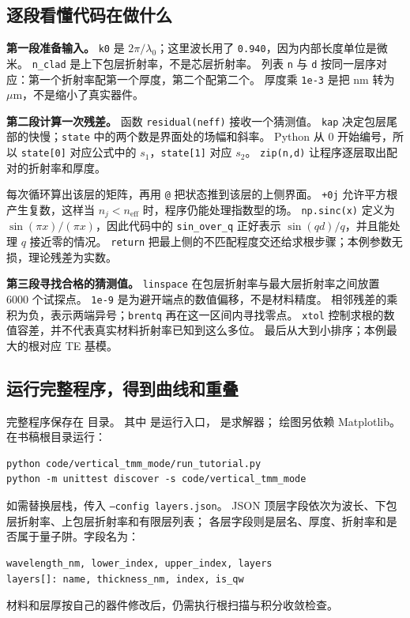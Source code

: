 \subsection{逐段看懂代码在做什么}
\textbf{第一段准备输入。}
\texttt{k0} 是 $2\pi/\lambda_0$；这里波长用了 \texttt{0.940}，因为内部长度单位是微米。
\texttt{n\_clad} 是上下包层折射率，不是芯层折射率。
列表 \texttt{n} 与 \texttt{d} 按同一层序对应：第一个折射率配第一个厚度，第二个配第二个。
厚度乘 \texttt{1e-3} 是把 nm 转为 $\mu$m，不是缩小了真实器件。

\textbf{第二段计算一次残差。}
函数 \texttt{residual(neff)} 接收一个猜测值。
\texttt{kap} 决定包层尾部的快慢；\texttt{state} 中的两个数是界面处的场幅和斜率。
Python 从 0 开始编号，所以 \texttt{state[0]} 对应公式中的 $s_1$，\texttt{state[1]} 对应 $s_2$。
\texttt{zip(n,d)} 让程序逐层取出配对的折射率和厚度。

每次循环算出该层的矩阵，再用 \texttt{@} 把状态推到该层的上侧界面。
\texttt{+0j} 允许平方根产生复数，这样当 $n_j<n_{\mathrm{eff}}$ 时，程序仍能处理指数型的场。
\texttt{np.sinc(x)} 定义为 $\sin(\pi x)/(\pi x)$，因此代码中的
\texttt{sin\_over\_q} 正好表示 $\sin(qd)/q$，并且能处理 $q$ 接近零的情况。
\texttt{return} 把最上侧的不匹配程度交还给求根步骤；本例参数无损，理论残差为实数。

\textbf{第三段寻找合格的猜测值。}
\texttt{linspace} 在包层折射率与最大层折射率之间放置 6000 个试探点。
\texttt{1e-9} 是为避开端点的数值偏移，不是材料精度。
相邻残差的乘积为负，表示两端异号；\texttt{brentq} 再在这一区间内寻找零点。
\texttt{xtol} 控制求根的数值容差，并不代表真实材料折射率已知到这么多位。
最后从大到小排序；本例最大的根对应 TE 基模。

\subsection{运行完整程序，得到曲线和重叠}
完整程序保存在  目录。
其中  是运行入口， 是求解器；
绘图另依赖 Matplotlib。在书稿根目录运行：
\begin{lstlisting}[basicstyle=\ttfamily\small,columns=fullflexible,keepspaces=true,breaklines=true]
python code/vertical_tmm_mode/run_tutorial.py
python -m unittest discover -s code/vertical_tmm_mode
\end{lstlisting}
如需替换层栈，传入 \texttt{--config layers.json}。
JSON 顶层字段依次为波长、下包层折射率、上包层折射率和有限层列表；
各层字段则是层名、厚度、折射率和是否属于量子阱。字段名为：
\begin{lstlisting}[basicstyle=\ttfamily\small,columns=fullflexible,keepspaces=true,breaklines=true]
wavelength_nm, lower_index, upper_index, layers
layers[]: name, thickness_nm, index, is_qw
\end{lstlisting}
材料和层厚按自己的器件修改后，仍需执行根扫描与积分收敛检查。

